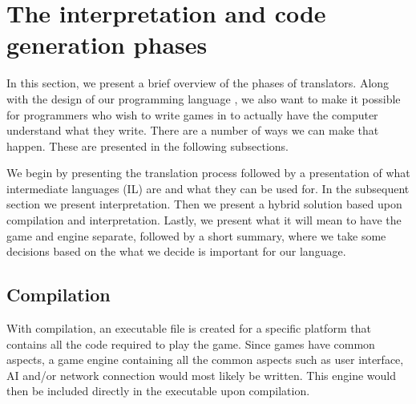 \section{The interpretation and code generation phases}
\label{sec:codegenerationandinterpretation}

In this section, we present a brief overview of the phases of
translators. Along with the design of our programming language
\productname{}, we also want to make it possible for programmers who
wish to write games in \productname{} to actually have the computer
understand what they write. There are a number of ways we can make that
happen. These are presented in the following subsections.

We begin by presenting the translation process followed by a
presentation of what intermediate languages (IL) are and what they can
be used for. In the subsequent section we present interpretation. Then
we present a hybrid solution based upon compilation and interpretation.
Lastly, we present what it will mean to have the game and engine
separate, followed by a short summary, where we take some decisions
based on the what we decide is important for our language.



\subsection{Compilation}
\label{sec:compilation}
With compilation, an executable file is created for a specific platform
that contains all the code required to play the game. Since games have
common aspects, a game engine containing all the common aspects such
as user interface, AI and/or network connection would most likely be
written. This engine would then be included directly in the executable
upon compilation.

